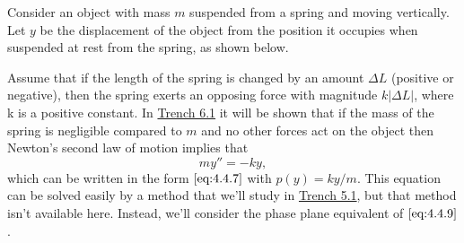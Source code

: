 \documentclass{ximera}
\begin{document}
 
 
\begin{example}\label{example:4.4.1}
 Consider an object with mass $m$ suspended from a
spring and moving vertically. Let $y$ be the displacement of the
object from the position it occupies when suspended at rest from the
spring, as shown below.

\begin{center}
\end{center}
 
 
Assume that if the length of the spring is changed by an amount
$\Delta L$ (positive or negative), then the spring exerts an opposing
force with magnitude $k|\Delta L|$, where k is a positive constant. In \href{https://ximera.osu.edu/ode/main/springProblemsI/springProblemsI}{Trench 6.1} it will be shown that if the mass of the spring
is negligible compared to $m$ and no other forces act on the object then
Newton's second law of motion implies that
\begin{equation}\label{eq:4.4.9}
my''=-ky,
\end{equation}
which can be written in the form $\eqref{eq:4.4.7}$ with $p(y)=ky/m$. This
equation can be solved easily by a method that we'll study in
 \href{https://ximera.osu.edu/ode/main/constantCoefficientHomogeneousEquations/constantCoefficientHomogeneousEquations}{Trench 5.1}, but that method isn't available here. Instead,
we'll consider the phase plane equivalent of $\eqref{eq:4.4.9}$.
 

\end{example}
\end{document}
